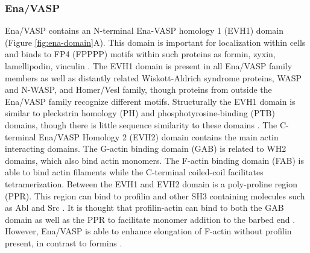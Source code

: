 \subsubsection{Ena/VASP}
Ena/VASP contains an N-terminal Ena-VASP homology 1 (EVH1) domain (Figure \ref{fig:ena-domain}A). This domain is important for localization within cells and binds to FP4 (FPPPP) motifs within such proteins as formin, zyxin, lamellipodin, vinculin \citep{ball_dual_2000, niebuhr_novel_1997, klostermann_orthologous_2000}. The EVH1 domain is present in all Ena/VASP family members as well as distantly related Wiskott-Aldrich syndrome proteins, WASP and N-WASP, and Homer/Vesl family, though proteins from outside the Ena/VASP family recognize different motifs. Structurally the EVH1 domain is similar to pleckstrin homology (PH) and phosphotyrosine-binding (PTB) domains, though there is little sequence similarity to these domains \citep{prehoda_structure_1999,reinhard_actin-based_2001,ball_dual_2000,fedorov_structure_1999}.
The C-terminal Ena/VASP Homology 2 (EVH2) domain contains the main actin interacting domains. The G-actin binding domain (GAB) is related to WH2 domains, which also bind actin monomers. The F-actin binding domain (FAB) is able to bind actin filaments while the C-terminal coiled-coil facilitates tetramerization. Between the EVH1 and EVH2 domain is a poly-proline region (PPR). This region can bind to profilin and other SH3 containing molecules such as Abl and Src \citep{lanier_abl_2000, gertler_mena_1996}. It is thought that profilin-actin can bind to both the GAB domain as well as the PPR to facilitate monomer addition to the barbed end \citep{ferron_structural_2007}. However, Ena/VASP is able to enhance elongation of F-actin without profilin present, in contrast to formins \citep{hansen_vasp_2010,breitsprecher_molecular_2011,winkelman_ena/vasp_2014,bruhmann_distinct_2017}.

